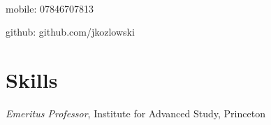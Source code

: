 \documentclass[11pt, a4paper]{article}
\begin{document}
\textsf{\\[0.2in]}

\begin{minipage}[b]{2in}
\small{mobile: 07846707813}
\end{minipage}
\begin{minipage}[b]{2in}
\end{minipage}
\begin{minipage}[b]{2in}
\begin{flushright}\small{github: github.com/jkozlowski}\end{flushright}
\end{minipage}

\section*{Skills}
\emph{Emeritus Professor}, Institute for Advanced Study, Princeton
\end{document}
